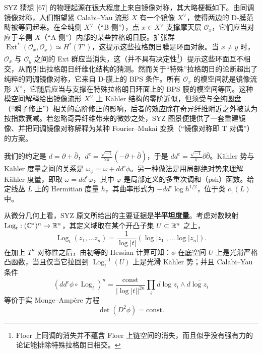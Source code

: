SYZ 猜想 [67] 的物理起源在很大程度上来自镜像对称，其大略梗概如下。由同调镜像对称，人们期望紧 Calabi--Yau 流形 $X$ 有一个镜像 $X^\vee$，使得两边的 D-膜范畴被等同起来。在全纯侧 $X^\vee$（“B-侧”），点 $x\in X^\vee$ 支撑摩天层 $\mathcal{O}_x$，它们应当对应于辛侧 $X$（“A-侧”）内部的某些拉格朗日膜。扩张群 $\operatorname{Ext}^*(\mathcal{O}_x,\mathcal{O}_x)\simeq H^*(T^n)$，这提示这些拉格朗日膜是环面对象。当 $x\ne y$ 时，$\mathcal{O}_x$ 与 $\mathcal{O}_y$ 之间的 Ext 群应当消失，这（并不具有决定性\footnote{Floer 上同调的消失并不蕴含 Floer 上链空间的消失，而且似乎没有强有力的论证能排除特殊拉格朗日相交。}）提示这些环面互不相交，从而引出拉格朗日纤维化结构的猜测。然而关于“特殊”拉格朗日的论断超出了纯粹的同调镜像对称，它来自 D-膜上的 BPS 条件。所有 $\mathcal{O}_x$ 的模空间就是镜像流形 $X^\vee$，它随后应当与支撑在特殊拉格朗日环面上的 BPS 膜的模空间等同。这种模空间解释给出镜像流形 $X^\vee$ 上 Kähler 结构的零阶近似，但须受与全纯圆盘（“瞬子修正”）相关的高阶修正的影响，后者的效应除在奇异纤维附近之外被认为按指数衰减。若忽略奇异纤维带来的微妙之处，SYZ 图景便提供了一套重建镜像、并把同调镜像对称解释为某种 Fourier--Mukai 变换（“镜像对称即 T 对偶”）的方案。


我们的约定是 $d=\partial+\bar{\partial}$，$d^c=\frac{\sqrt{-1}}{2\pi}(-\partial+\bar{\partial})$，于是 $dd^c=\frac{\sqrt{-1}}{\pi}\partial\bar{\partial}$。Kähler 势与 Kähler 度量之间的关系是 $\omega_\phi=\omega+dd^c\phi$。另一种做法是用局部绝对势来理解 Kähler 度量，即取 $\omega=dd^c\varphi$，其中 $\varphi$ 是局部定义的多重次调和（psh）函数。给定线丛 $L$ 上的 Hermitian 度量 $h$，其曲率形式为 $-dd^c\log h^{1/2}$，位于类 $c_1(L)$ 中。


从微分几何上看，SYZ 原文所给出的主要证据是\textbf{半平坦度量}。考虑对数映射 $\operatorname{Log}_t:(\mathbb{C}^*)^n\to\mathbb{R}^n$，其定义域取在某个开凸子集 $U\subset\mathbb{R}^n$ 之上，
\[
\operatorname{Log}_t(z_1,\dots z_n) = \frac{1}{\log|t|}(\log|z_1|,\dots\log|z_n|).
\]
在加上 $T^n$ 对称性之后，由初等的 Hessian 计算可知：$\phi$ 在底空间 $U$ 上是光滑严格凸函数，当且仅当它拉回到 $\operatorname{Log}_t^{-1}(U)$ 上是光滑 Kähler 势；并且 Calabi--Yau 条件
\[
(dd^c\phi\circ\operatorname{Log}_t)^n = \frac{\mathrm{const}}{|\log|t||^{2n}}\prod_i d\log z_i\wedge d\overline{\log z_i}
\]
等价于实 Monge--Ampère 方程
\[
\det(D^2\phi)=\mathrm{const}.
\]


